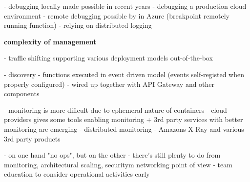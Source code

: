 - debugging locally made possible in recent years
- debugging a production cloud environment - remote debugging possible by in Azure (breakpoint remotely running function) - relying on distributed logging

\textbf{complexity of management} 

- traffic shifting supporting various deployment models out-of-the-box

- discovery - functions executed in event driven model (events self-registed when properly configured) - wired up together with API Gateway and other components

- monitoring is more dificult due to ephemeral nature of containers - cloud providers gives some tools enabling monitoring + 3rd party services with better monitoring are emerging
- distributed monitoring - Amazons X-Ray and various 3rd party products

- on one hand "no ops", but on the other - there's still plenty to do from monitoring, architectural scaling, securitym networking point of view - team education to consider operational activities early

 




